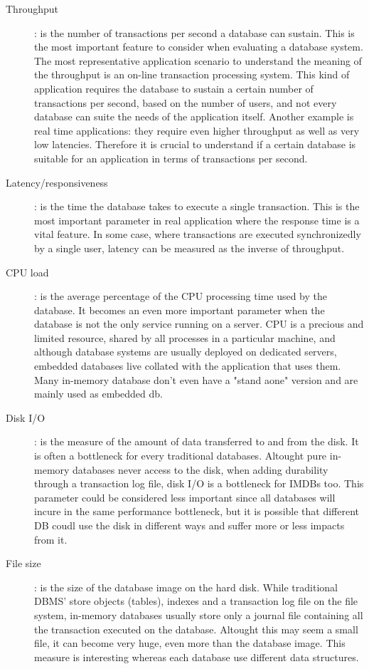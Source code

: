 \begin{description}

	\item[Throughput]: is the number of transactions per second a database can sustain. This is the most important feature to consider when evaluating a database system. The most representative application scenario to understand the meaning of the throughput is an on-line transaction processing system. This kind of application requires the database to sustain a certain number of transactions per second, based on the number of users, and not every database can suite the needs of the application itself. Another example is real time applications: they require even higher throughput as well as very low latencies. Therefore it is crucial to understand if a certain database is suitable for an application in terms of transactions per second.
	
	\item[Latency/responsiveness]: is the time the database takes to execute a single transaction. This is the most important parameter in real application where the response time is a vital feature. In some case, where transactions are executed synchronizedly by a single user, latency can be measured as the inverse of throughput.
	
	\item[CPU load]: is the average percentage of the CPU processing time used by the database. It becomes an even more important parameter when the database is not the only service running on a server. CPU is a precious and limited resource, shared by all processes in a particular machine, and although database systems are usually deployed on dedicated servers, embedded databases live collated with the application that uses them. Many in-memory database 	don't even have a "stand aone" version and are mainly used as embedded db.
	
	\item[Disk I/O]: is the measure of the amount of data transferred to and from the disk. It is often a bottleneck for every traditional databases. Altought pure in-memory databases never access to the disk, when adding durability through a transaction log file, disk I/O is a bottleneck for IMDBs too. This parameter could be considered less important since all databases will incure in the same performance bottleneck, but it is possible that different DB coudl use the disk in different ways and suffer more or less impacts from it.
	
	\item[File size]: is the size of the database image on the hard disk. While traditional DBMS' store objects (tables), indexes and a transaction log file on the file system, in-memory databases usually store only a journal file containing all the transaction executed on the database. Altought this may seem a small file, it can become very huge, even more than the database image. This measure is interesting whereas each database use different data structures.
	

\end{description}
